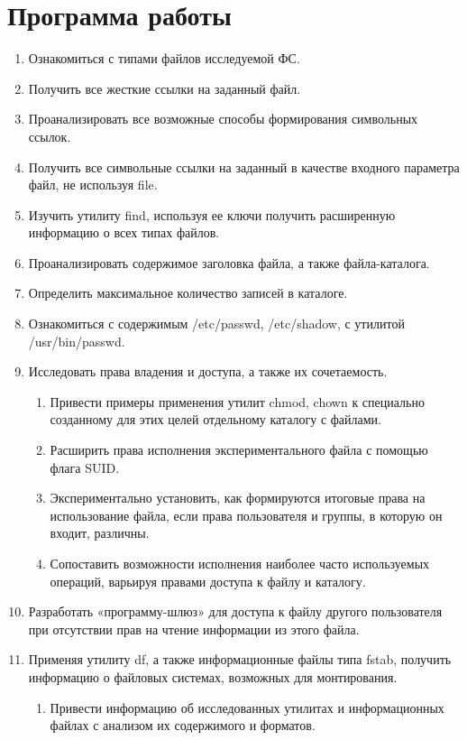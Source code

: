 \documentclass[14pt,a4paper,report]{report}
\begin{document}
\section{Программа работы}

\begin{enumerate}
	\item Ознакомиться с типами файлов исследуемой ФС.
	\item Получить все жесткие ссылки на заданный файл.
	\item Проанализировать все возможные способы формирования символьных ссылок.
	\item Получить все символьные ссылки на заданный в качестве входного параметра файл, не используя file.
	\item Изучить утилиту find, используя ее ключи получить расширенную информацию о всех типах файлов.
	\item Проанализировать содержимое заголовка файла, а также файла-каталога. 
	\item Определить максимальное количество записей в каталоге.
	\item Ознакомиться с содержимым /etc/passwd, /etc/shadow, с утилитой /usr/bin/passwd.
	\item Исследовать права владения и доступа, а также их сочетаемость. 
	\begin{enumerate}
		\item Привести примеры применения утилит chmod, chown к специально созданному для этих целей отдельному каталогу с файлами. 
		\item Расширить права исполнения экспериментального файла с помощью флага SUID. 
		\item Экспериментально установить, как формируются итоговые права на использование файла, если права пользователя и группы, в которую он входит, различны.
		\item Сопоставить возможности исполнения наиболее часто используемых операций, варьируя правами доступа к файлу и каталогу.
	\end{enumerate}
	\item Разработать «программу-шлюз» для доступа к файлу другого пользователя при отсутствии прав на чтение информации из этого файла. 
	\item Применяя утилиту df, а также информационные файлы типа fstab, получить информацию о файловых системах, возможных для монтирования. 
	\begin{enumerate}
		\item Привести информацию об исследованных утилитах и информационных файлах с анализом их содержимого и форматов. 

\end{enumerate}
\end{enumerate}
\end{document}
